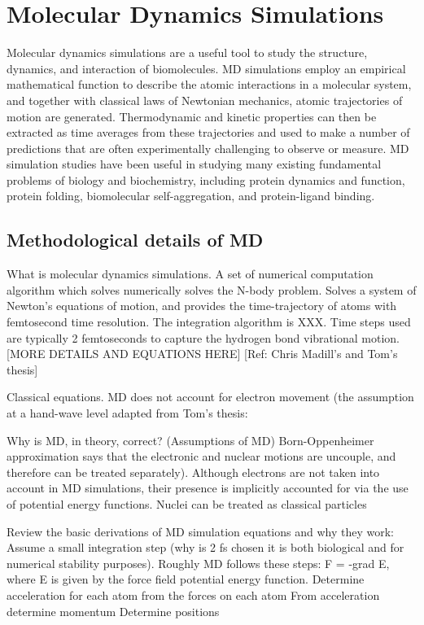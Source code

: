 \section{Molecular Dynamics Simulations}
\1 Molecular dynamics simulations are a useful tool to study the structure, dynamics, and interaction of biomolecules. MD simulations employ an empirical mathematical function to describe the atomic interactions in a molecular system, and together with classical laws of Newtonian mechanics, atomic trajectories of motion are generated. Thermodynamic and kinetic properties can then be extracted as time averages from these trajectories and used to make a number of predictions that are often experimentally challenging to observe or measure. 
\1 MD simulation studies have been useful in studying many existing fundamental problems of biology and biochemistry, including protein dynamics and function, protein folding, biomolecular self-aggregation, and protein-ligand binding.

\subsection{Methodological details of MD}
\1 What is molecular dynamics simulations. A set of numerical computation algorithm which solves numerically solves the N-body problem. Solves a system of Newton's equations of motion, and provides the time-trajectory of atoms with femtosecond time resolution. The integration algorithm is XXX. Time steps used are typically 2 femtoseconds to capture the hydrogen bond vibrational motion. [MORE DETAILS AND EQUATIONS HERE] [Ref: Chris Madill's and Tom's thesis]

\1 Classical equations.  MD does not account for electron movement (the assumption at a hand-wave level adapted from Tom's thesis: 

\1 Why is MD, in theory, correct? (Assumptions of MD)
  \2 Born-Oppenheimer approximation says that the electronic and nuclear motions are uncouple, and therefore can be treated separately). Although electrons are not taken into account in MD simulations, their presence is implicitly accounted for via the use of potential energy functions.  Nuclei can be treated as classical particles

  \2 Review the basic derivations of MD simulation equations and why they work:
    \3 Assume a small integration step (why is 2 fs chosen it is both biological and for numerical stability purposes). Roughly MD follows these steps:
      \4 F = -grad E, where E is given by the force field potential energy function.
      \4 Determine acceleration for each atom from the forces on each atom
      \4 From acceleration determine momentum 
      \4 Determine positions

